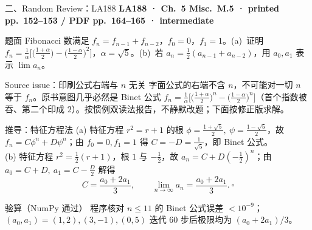 \documentclass[aspectratio=169,10pt,fontset=none]{ctexbeamer}
\newcommand{\ex}[1]{\textcolor{accent}{\footnotesize\bfseries #1}}
\begin{document}
\begin{frame}[t]{二、Random Review：LA188}
  \leavevmode\ex{LA188 · Ch.~5 Misc.\ M.5 · printed pp.~152--153 / PDF pp.~164--165 · intermediate}
  \begin{block}{\footnotesize 题面}
    \scriptsize Fibonacci 数满足 $f_n=f_{n-1}+f_{n-2}$，$f_0=0$，$f_1=1$。(a)~证明 $f_n=\frac1\alpha\big[\big(\tfrac{1+\alpha}2\big)-\big(\tfrac{1-\alpha}2\big)^2\big]$，$\alpha=\sqrt5$。(b)~若 $a_n=\frac12(a_{n-1}+a_{n-2})$，用 $a_0,a_1$ 表示 $\lim a_n$。
  \end{block}
  \begin{alertblock}{\footnotesize Source issue：印刷公式右端与 $n$ 无关}
    \scriptsize 字面公式的右端不含 $n$，不可能对一切 $n$ 等于 $f_n$。原书意图几乎必然是 Binet 公式 $f_n=\frac1\alpha\big[\big(\tfrac{1+\alpha}2\big)^n-\big(\tfrac{1-\alpha}2\big)^n\big]$（首个指数被吞、第二个印成 $2$）。按惯例双读法报告，不静默改题；下面按修正版求解。
  \end{alertblock}
  \begin{exampleblock}{\footnotesize 推导：特征方程法}
    \scriptsize
    (a) 特征方程 $r^2=r+1$ 的根 $\phi=\tfrac{1+\sqrt5}2,\ \psi=\tfrac{1-\sqrt5}2$，故 $f_n=C\phi^n+D\psi^n$；由 $f_0=0,f_1=1$ 得 $C=-D=\tfrac1{\sqrt5}$，即 Binet 公式。\\
    (b) 特征方程 $r^2=\tfrac12(r+1)$，根 $1$ 与 $-\tfrac12$，故 $a_n=C+D(-\tfrac12)^n$；由 $a_0=C+D,\ a_1=C-\tfrac D2$ 解得
    $$C=\frac{a_0+2a_1}{3},\qquad \lim_{n\to\infty}a_n=\frac{a_0+2a_1}{3}.\ \square$$
  \end{exampleblock}
  \begin{block}{\footnotesize 验算（NumPy 通过）}
    \scriptsize 程序核对 $n\le11$ 的 Binet 公式误差 $<10^{-9}$；$(a_0,a_1)=(1,2),(3,-1),(0,5)$ 迭代 60 步后极限均为 $(a_0+2a_1)/3$。
  \end{block}
\end{frame}
\end{document}
